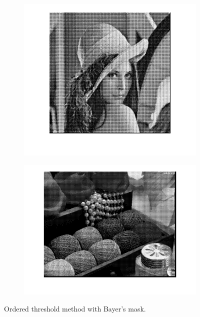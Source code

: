 \documentclass{article}
\begin{document}
 \begin{figure}
        \centering
        \begin{subfigure}[b]{0.49\textwidth}
            \includegraphics[width=\textwidth]{Images/lena_diagonal_dispersed.png}
        \end{subfigure}
        \begin{subfigure}[b]{0.49\textwidth}
            \includegraphics[width=\textwidth]{Images/wool_dispersed.png}
        \end{subfigure}
        \caption{Ordered threshold method with Bayer's mask.}
        \label{fig:diagonal_dispersed}
\end{figure}
\end{document}
